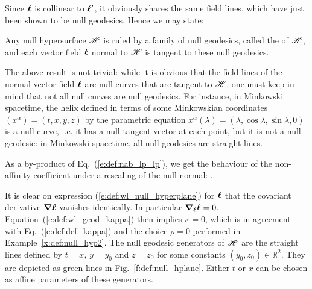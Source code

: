 Since $\bm{\ell}$ is collinear to $\bm{\ell}'$, it obviously shares the same field lines,
which have just been shown to be null geodesics. Hence we may state:

\begin{prop}
\label{p:def:null_geod_generators}
Any null hypersurface $\mathscr{H}$ is ruled by a family of null geodesics, called the
 of $\mathscr{H}$, and each vector field $\bm{\ell}$ normal to $\mathscr{H}$ is
tangent to these null geodesics.
\end{prop}

\begin{remark}
\label{r:def:null_curves}
The above result is not trivial: while it is obvious that the field lines of the normal
vector field $\bm{\ell}$ are null curves that are tangent to $\mathscr{H}$, one must
keep in mind that not all null curves are null geodesics. For instance, in
Minkowski spacetime, the helix defined in terms of
some Minkowskian coordinates $(x^\alpha)=(t,x,y,z)$ by the parametric equation
$x^\alpha(\lambda) = (\lambda, \cos\lambda, \sin\lambda, 0)$ is a null curve, i.e.
it has
a null tangent vector at each point, but it is not a null geodesic: in Minkowski
spacetime, all null geodesics are straight lines.
\end{remark}

As a by-product of Eq.~(\ref{e:def:nab_lp_lp}), we get the behaviour of the
non-affinity coefficient under a rescaling of the null normal:
\be \label{e:def:rescale_kappa}
   .
\ee

\begin{example} \label{x:def:null_hyp3}
It is clear on expression (\ref{e:def:wl_null_hyperplane}) for $\bm{\ell}$ that
the covariant derivative
$\bm{\nabla} \bm{\ell}$ vanishes identically. In particular $\bm{\nabla}_{\bm{\ell}} \bm{\ell} = 0$.
Equation~(\ref{e:def:wl_geod_kappa}) then implies $\kappa = 0$,
which is in agreement with Eq.~(\ref{e:def:def_kappa}) and the choice $\rho=0$
performed in Example~\ref{x:def:null_hyp2}. The null geodesic generators of $\mathscr{H}$ are the
straight lines defined by $t=x$, $y=y_0$ and $z=z_0$ for some constants
$(y_0,z_0)\in \mathbb{R}^2$.
They are depicted as green lines in Fig.~\ref{f:def:null_hplane}.
 Either $t$ or $x$ can be chosen as affine
parameters of these generators.
\end{example}

